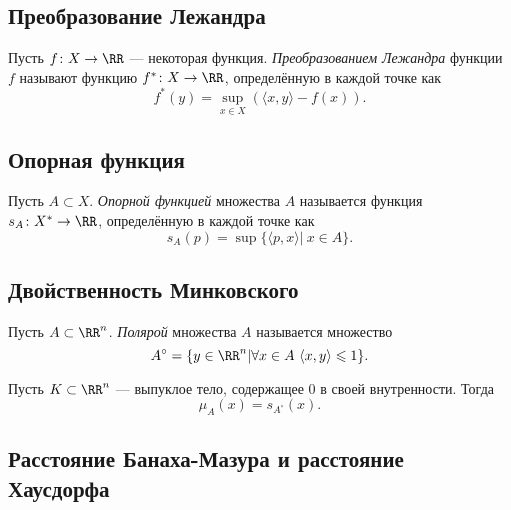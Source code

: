\subsection{Преобразование Лежандра}
\begin{defin}
	Пусть $f\colon X\to\RR$ --- некоторая функция. \textit{Преобразованием Лежандра} функции $f$ называют функцию $f^*\colon X\to\RR$, определённую в каждой точке как
		\begin{equation}
			f^*(y)=\sup_{x\in X}(\langle x,y\rangle-f(x)).
		\end{equation}
\end{defin}

\subsection{Опорная функция}
\begin{defin}
	Пусть $A\subset X$. \textit{Опорной функцией} множества $A$ называется функция $s_A\colon X^*\to\RR$, определённую в каждой точке как
		\begin{equation}
			s_A(p)=\sup\{\langle p,x\rangle|\ x\in A\}.
		\end{equation}
\end{defin}

\subsection{Двойственность Минковского}
\begin{defin}
	Пусть $A\subset\RR^n$. \textit{Полярой} множества $A$ называется множество
		\begin{equation}
			A^{\circ}=\{y\in\RR^n|\forall x\in A\ \langle x,y\rangle\leqslant 1\}.
		\end{equation}
\end{defin}
\begin{prop}
	Пусть $K\subset\RR^n$ --- выпуклое тело, содержащее 0 в своей внутренности. Тогда
		\begin{equation}
			\mu_A(x)=s_{A^{\circ}}(x).
		\end{equation}
\end{prop}

\subsection{Расстояние Банаха-Мазура и расстояние Хаусдорфа}
